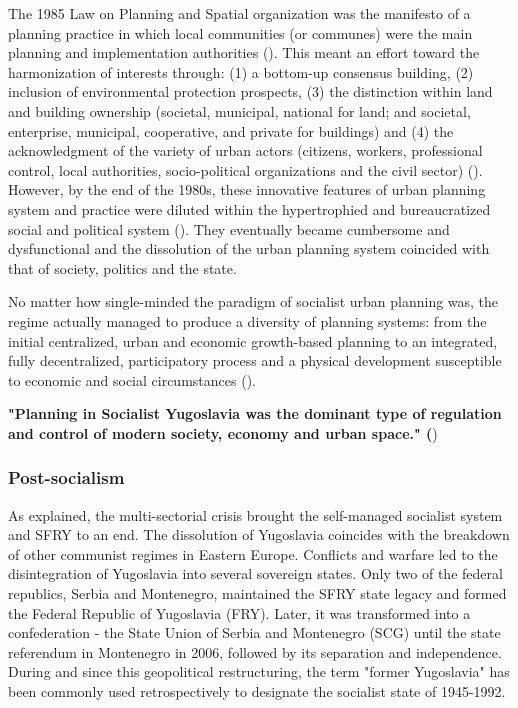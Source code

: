 \documentclass[11pt]{report}
\begin{document}
\begin{enumerate}
The 1985 Law on Planning and Spatial organization was the manifesto of a planning practice in which local communities (or communes) were the main planning and implementation authorities (\href{Vujosevic}{\citealt{vujosevic_planning_2006}}). This meant an effort toward the harmonization of interests through: (1) a bottom-up consensus building, (2) inclusion of environmental protection prospects, (3) the distinction within land and building ownership (societal, municipal, national for land; and societal, enterprise, municipal, cooperative, and private for buildings) and (4) the acknowledgment of the variety of urban actors (citizens, workers, professional control, local authorities, socio-political organizations and the civil sector) (\href{Nedovic}{\citealt{nedovic-budic_adjustment_2001}}).
However, by the end of the 1980s, these innovative features of urban planning system and practice were diluted within the hypertrophied and bureaucratized social and political system (\href{Peric}{\citealt{peric_evolution_2016}}). They eventually became cumbersome and dysfunctional and the dissolution of the urban planning system coincided with that of society, politics and the state.
\end{enumerate}

No matter how single-minded the paradigm of socialist urban planning was, the regime actually managed to produce a diversity of planning systems:  from the initial centralized, urban and economic growth-based planning to an integrated, fully decentralized, participatory process and a physical development susceptible to economic and social circumstances (\href{Haussemann}{\citealt{haussermann_socialist_1996}}).

\textbf{"Planning  in  Socialist  Yugoslavia  was  the  dominant  type  of  regulation  and  control  of  modern  society, economy and urban space." (\href{Vukmirovic}{\citealt{vukmirovic_city_2013}}})

\subsubsection{Post-socialism}

As explained, the multi-sectorial crisis brought the self-managed socialist system and SFRY to an end. The dissolution of Yugoslavia coincides with the breakdown of other communist regimes in Eastern Europe. Conflicts and warfare led to the disintegration of Yugoslavia into several sovereign states. Only two of the federal republics, Serbia and Montenegro, maintained the SFRY state legacy and formed the Federal Republic of Yugoslavia (FRY). Later, it was transformed into a confederation - the State Union of Serbia and Montenegro (SCG) until the state referendum in Montenegro in 2006, followed by its separation and independence. During and since this geopolitical restructuring, the term "former Yugoslavia" has been commonly used retrospectively to designate the socialist state of 1945-1992.
\\
\end{document}
